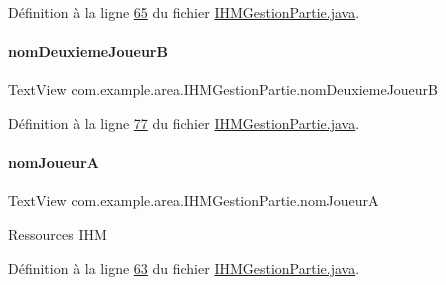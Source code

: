Définition à la ligne \hyperlink{_i_h_m_gestion_partie_8java_source_l00065}{65} du fichier \hyperlink{_i_h_m_gestion_partie_8java_source}{I\+H\+M\+Gestion\+Partie.\+java}.

\mbox{\label{classcom_1_1example_1_1area_1_1_i_h_m_gestion_partie_a68aa62c03f3280a8f22d84e1701c1c3e}} 
\paragraph{\texorpdfstring{nom\+Deuxieme\+JoueurB}{nomDeuxiemeJoueurB}}
{\footnotesize\ttfamily Text\+View com.\+example.\+area.\+I\+H\+M\+Gestion\+Partie.\+nom\+Deuxieme\+JoueurB\hspace{0.3cm}{\ttfamily [private]}}



Définition à la ligne \hyperlink{_i_h_m_gestion_partie_8java_source_l00077}{77} du fichier \hyperlink{_i_h_m_gestion_partie_8java_source}{I\+H\+M\+Gestion\+Partie.\+java}.

\mbox{\label{classcom_1_1example_1_1area_1_1_i_h_m_gestion_partie_ad7ac57a177098fba4ba7ea29a2418f10}} 
\paragraph{\texorpdfstring{nom\+JoueurA}{nomJoueurA}}
{\footnotesize\ttfamily Text\+View com.\+example.\+area.\+I\+H\+M\+Gestion\+Partie.\+nom\+JoueurA\hspace{0.3cm}{\ttfamily [private]}}

Ressources I\+HM 

Définition à la ligne \hyperlink{_i_h_m_gestion_partie_8java_source_l00063}{63} du fichier \hyperlink{_i_h_m_gestion_partie_8java_source}{I\+H\+M\+Gestion\+Partie.\+java}.

